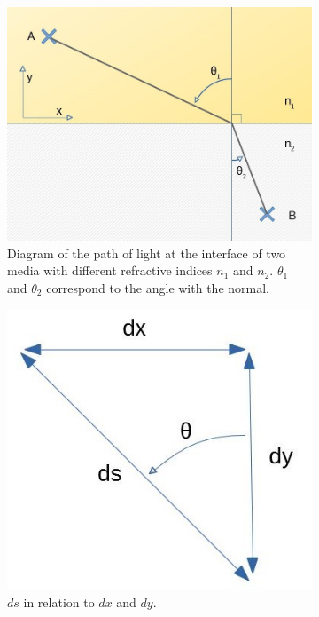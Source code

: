 \documentclass{article}
\begin{document}
\begin{figure}[h!]
\centering
  \begin{subfigure}[b]{0.3\textwidth}
    \includegraphics[width=\textwidth]{afbeeldingen/snell_analytical.jpg}
	\caption{Diagram of the path of light at the interface of two media with different refractive indices $n_1$ and $n_2$. $\theta _1$ and $\theta _2$ correspond to the angle with the normal.}
	\label{fig_snell_analytical}
  \end{subfigure}
  \hspace{0.1\textwidth}
  \begin{subfigure}[b]{0.2\textwidth}
    \includegraphics[width=\textwidth]{afbeeldingen/ds.jpg}
	\caption{$ds$ in relation to $dx$ and $dy$.}
	\label{fig_ds}
  \end{subfigure}
  \caption{}
\end{figure}
\end{document}
